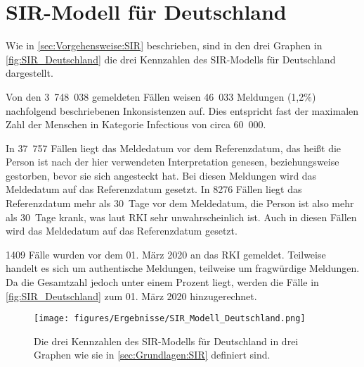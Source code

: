 \newpage
\section{SIR-Modell für Deutschland}\label{sec:Resultate-SIR}
Wie in \autoref{sec:Vorgehensweise:SIR} beschrieben, sind in den drei Graphen in \autoref{fig:SIR_Deutschland} die drei Kennzahlen des SIR-Modells für Deutschland dargestellt.

Von den 3~748~038 gemeldeten Fällen weisen 46~033 Meldungen (1,2\%) nachfolgend beschriebenen Inkonsistenzen auf. Dies entspricht fast der maximalen Zahl der Menschen in Kategorie \glqq{}Infectious\grqq{} von circa 60~000.

In 37~757 Fällen liegt das Meldedatum vor dem Referenzdatum, das heißt die Person ist nach der hier verwendeten Interpretation genesen, beziehungsweise gestorben, bevor sie sich angesteckt hat. Bei diesen Meldungen wird das Meldedatum auf das Referenzdatum gesetzt.
In 8276 Fällen liegt das Referenzdatum mehr als 30~Tage vor dem Meldedatum, die Person ist also mehr als 30~Tage krank, was laut RKI sehr unwahrscheinlich ist.\autocite{RKI_Bulletin} Auch in diesen Fällen wird das Meldedatum auf das Referenzdatum gesetzt.

1409 Fälle wurden vor dem 01. März 2020 an das RKI gemeldet. Teilweise handelt es sich um authentische Meldungen, teilweise um fragwürdige Meldungen. Da die Gesamtzahl jedoch unter einem Prozent liegt, werden die Fälle in \autoref{fig:SIR_Deutschland} zum 01. März 2020 hinzugerechnet.

\begin{figure}[H]
    \centering
    \texttt{[image: figures/Ergebnisse/SIR\_Modell\_Deutschland.png]}
    \caption{Die drei Kennzahlen des SIR-Modells für Deutschland in drei Graphen wie sie in \autoref{sec:Grundlagen:SIR} definiert sind.}
    \label{fig:SIR_Deutschland}
\end{figure}